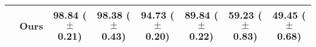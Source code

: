 \begin{table*}[t]
{\begin{tabular}{l l c c c c c c}
     & Ours & {\bf 98.84} {\scriptsize ($\pm$ 0.21)} & {\bf 98.38} {\scriptsize ($\pm$ 0.43)} & {\bf 94.73} {\scriptsize ($\pm$ 0.20)} & {\bf 89.84} {\scriptsize ($\pm$ 0.22)} & {\bf 59.23}  {\scriptsize ($\pm$ 0.83)} & {\bf 49.45}  {\scriptsize ($\pm$ 0.68)} \\
    \bottomrule
\end{tabular}
}
\vspace{-3mm}
\label{tab:results_applying_scheduling_to_recent_replay_methods}
\end{table*}

\begin{comment}

\begin{table*}[t]
\footnotesize
\centering
\caption{
    Performance comparison between scheduling methods RS-MCTS (Ours), Random, ETS, and Heuristic when combining them with replay-based methods HAL, MER, DER, and DER++. %
    Replay memory sizes are $M=10$ and $M=100$ for the 5-task and 10/20-task datasets respectively. We report the mean and standard deviation averaged over 5 seeds. Results on Heuristic where some seed did not converge is denoted by $^{*}$. Applying RS-MCTS to each method can enhance the performance compared to using the baseline schedules. 
}
\scalebox{0.87}{
\begin{tabular}{l l c c c c c c}
    \toprule
     & & \multicolumn{3}{c}{{\bf 5-task Datasets}} & \multicolumn{3}{c}{{\bf 10- and 20-task Datasets}} \\
    \cmidrule(lr){3-5} \cmidrule(lr){6-8}
    {\bf Method} & {\bf Schedule}  & S-MNIST & S-FashionMNIST & S-notMNIST & P-MNIST & S-CIFAR-100 & S-miniImagenet \\
    \midrule
    \multirow{4}{*}{HAL} & Random & 97.24 {\scriptsize ($\pm$ 0.70)}  & 86.74 {\scriptsize ($\pm$ 6.05)} & 93.61 {\scriptsize($\pm$ 1.31)}  & 88.49 {\scriptsize ($\pm$ 0.99)}  & 36.09 {\scriptsize ($\pm$ 1.77)} & 38.51 {\scriptsize ($\pm$ 2.22)} \\
     & ETS  & 94.02 {\scriptsize ($\pm$ 4.25)} &  95.81 {\scriptsize ($\pm$ 3.53)} & 91.01 {\scriptsize ($\pm$ 1.39)} & 88.46 {\scriptsize ($\pm$ 0.86)}  & 34.90 {\scriptsize ($\pm$ 2.02)} & 38.13 {\scriptsize ($\pm$ 1.18)} \\
    & Heuristic & 97.69 {\scriptsize ($\pm$ 0.19)} & $^{*}$74.16 {\scriptsize ($\pm$ 11.19)} & 93.64 {\scriptsize ($\pm$ 0.93)} & $^{*}$66.63 {\scriptsize ($\pm$ 28.50)} & 35.07 {\scriptsize($\pm$ 1.29)} & 39.51 {\scriptsize($\pm$ 1.49)} \\

\end{comment}
